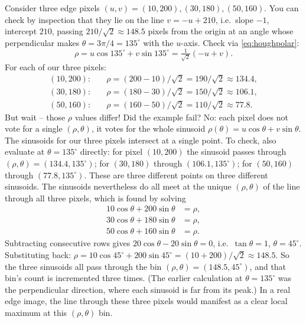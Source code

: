 \begin{example}
Consider three edge pixels $(u,v)=(10,200),(30,180),(50,160)$. You
can check by inspection that they lie on the line $v=-u+210$, i.e.\
slope $-1$, intercept $210$, passing $210/\sqrt{2}\approx 148.5$
pixels from the origin at an angle whose perpendicular makes
$\theta=3\pi/4=135^\circ$ with the $u$-axis. Check via
\eqref{eq:houghpolar}:
\[
\rho = u\cos 135^\circ + v\sin 135^\circ = \tfrac{1}{\sqrt 2}(-u+v).
\]
For each of our three pixels:
\begin{align*}
(10,200):&\quad \rho=(200-10)/\sqrt 2 = 190/\sqrt 2 \approx 134.4,\\
(30,180):&\quad \rho=(180-30)/\sqrt 2 = 150/\sqrt 2 \approx 106.1,\\
(50,160):&\quad \rho=(160-50)/\sqrt 2 = 110/\sqrt 2 \approx 77.8.
\end{align*}
But wait -- those $\rho$ values differ! Did the example fail? No: each
pixel does not vote for a single $(\rho,\theta)$, it votes for the
whole sinusoid $\rho(\theta) = u\cos\theta + v\sin\theta$. The
sinusoids for our three pixels intersect at a single point. To check,
also evaluate at $\theta=135^\circ$ directly: for pixel $(10,200)$ the
sinusoid passes through $(\rho,\theta)=(134.4,135^\circ)$; for
$(30,180)$ through $(106.1,135^\circ)$; for $(50,160)$ through
$(77.8,135^\circ)$. These are three different points on three
different sinusoids. The sinusoids nevertheless do all meet at the
unique $(\rho,\theta)$ of the line through all three pixels, which is
found by solving
\begin{align*}
10\cos\theta + 200\sin\theta &= \rho,\\
30\cos\theta + 180\sin\theta &= \rho,\\
50\cos\theta + 160\sin\theta &= \rho.
\end{align*}
Subtracting consecutive rows gives $20\cos\theta - 20\sin\theta = 0$,
i.e.\ $\tan\theta = 1$, $\theta=45^\circ$. Substituting back:
$\rho = 10\cos 45^\circ + 200\sin 45^\circ = (10+200)/\sqrt 2
\approx 148.5$. So the three sinusoids all pass through the bin
$(\rho,\theta)=(148.5,45^\circ)$, and that bin's count is incremented
three times. (The earlier calculation at $\theta=135^\circ$ was the
perpendicular direction, where each sinusoid is far from its peak.)
In a real edge image, the line through these three pixels would
manifest as a clear local maximum at this $(\rho,\theta)$ bin.
\end{example}

